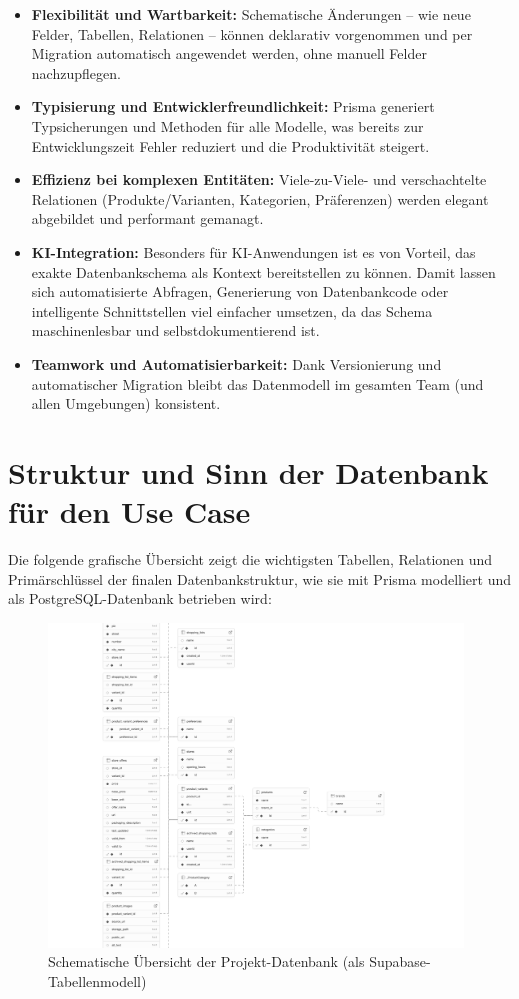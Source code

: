 \documentclass[12pt, a4paper]{report} %
\begin{document}
\begin{itemize}
    \item \textbf{Flexibilität und Wartbarkeit:} Schematische Änderungen – wie neue Felder, Tabellen, Relationen – können deklarativ vorgenommen und per Migration automatisch angewendet werden, ohne manuell Felder nachzupflegen.
    \item \textbf{Typisierung und Entwicklerfreundlichkeit:} Prisma generiert Typsicherungen und Methoden für alle Modelle, was bereits zur Entwicklungszeit Fehler reduziert und die Produktivität steigert.
    \item \textbf{Effizienz bei komplexen Entitäten:} Viele-zu-Viele- und verschachtelte Relationen (Produkte/Varianten, Kategorien, Präferenzen) werden elegant abgebildet und performant gemanagt.
    \item \textbf{KI-Integration:} Besonders für KI-Anwendungen ist es von Vorteil, das exakte Datenbankschema als Kontext bereitstellen zu können. Damit lassen sich automatisierte Abfragen, Generierung von Datenbankcode oder intelligente Schnittstellen viel einfacher umsetzen, da das Schema maschinenlesbar und selbstdokumentierend ist.
    \item \textbf{Teamwork und Automatisierbarkeit:} Dank Versionierung und automatischer Migration bleibt das Datenmodell im gesamten Team (und allen Umgebungen) konsistent.
\end{itemize}

\section{Struktur und Sinn der Datenbank für den Use Case}

Die folgende grafische Übersicht zeigt die wichtigsten Tabellen, Relationen und Primärschlüssel der finalen Datenbankstruktur, wie sie mit Prisma modelliert und als PostgreSQL-Datenbank betrieben wird:

\begin{figure}[h!]
    \centering
    \includegraphics[width=0.98\textwidth]{media/supabase-schema-vgqtxqfvygduzmuwlmba.png}
    \caption{Schematische Übersicht der Projekt-Datenbank (als Supabase-Tabellenmodell)}
    \label{fig:db-schema}
\end{figure}
\end{document}
